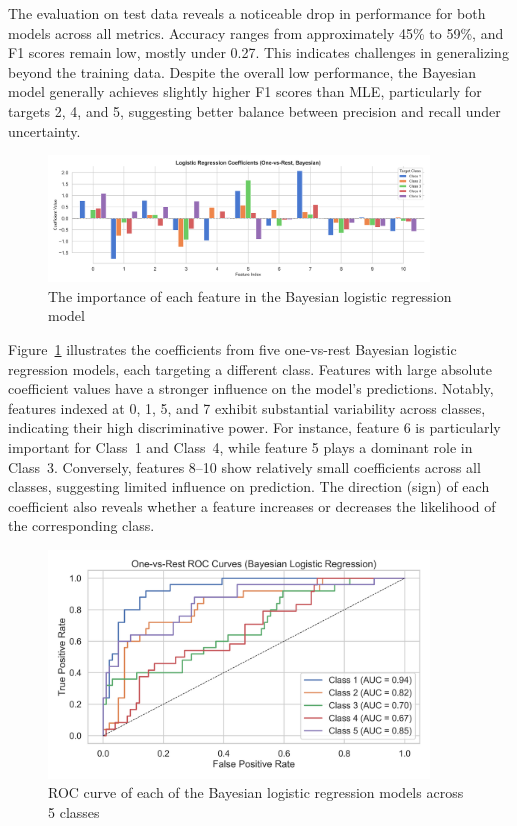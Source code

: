 The evaluation on test data reveals a noticeable drop in performance for both models across 
all metrics. Accuracy ranges from approximately 45\% to 59\%, and F1 scores remain low,
 mostly under 0.27. This indicates challenges in generalizing beyond the training data. 
 Despite the overall low performance, the Bayesian model generally achieves slightly 
 higher F1 scores than MLE, particularly for targets 2, 4, and 5,
 suggesting better balance between precision and recall under uncertainty.


\begin{figure}[!h]
    \centering
    \includegraphics[width=0.9\textwidth]{../results/ModelFitting2/bayesian_coef_plot.png}
    \caption{The importance of each feature in the Bayesian logistic regression model}
    \label{fig:bayesian_coef_plot}
\end{figure}

Figure~\ref{fig:bayesian_coef_plot} illustrates the coefficients 
from five one-vs-rest Bayesian logistic regression models, each targeting a different class. 
Features with large absolute coefficient values have a stronger influence on the model's predictions.
 Notably, features indexed at 0, 1, 5, and 7 exhibit substantial variability across classes, 
 indicating their high discriminative power. For instance, feature 6 is particularly important
  for Class~1 and Class~4, while feature 5 plays a dominant role in Class~3. Conversely, 
  features 8--10 show relatively small coefficients across all classes, suggesting limited 
  influence on prediction. The direction (sign) of each coefficient also reveals whether a 
  feature increases or decreases the likelihood of the corresponding class.

\begin{figure}[!h]
    \centering
    \includegraphics[width=0.9\textwidth]{../results/ModelFitting2/roc_curve_bayesian.png}
    \caption{ROC curve of each of the Bayesian logistic regression models across 5 classes}
    \label{fig:roc_curve_bayesian}
\end{figure}

